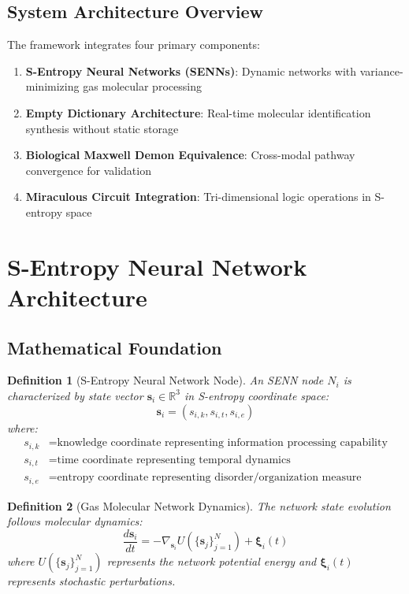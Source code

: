 \documentclass[12pt,a4paper]{article}
\newtheorem{definition}{Definition}
\begin{document}
\subsection{System Architecture Overview}

The framework integrates four primary components:

\begin{enumerate}
\item \textbf{S-Entropy Neural Networks (SENNs)}: Dynamic networks with variance-minimizing gas molecular processing
\item \textbf{Empty Dictionary Architecture}: Real-time molecular identification synthesis without static storage
\item \textbf{Biological Maxwell Demon Equivalence}: Cross-modal pathway convergence for validation
\item \textbf{Miraculous Circuit Integration}: Tri-dimensional logic operations in S-entropy space
\end{enumerate}

\section{S-Entropy Neural Network Architecture}

\subsection{Mathematical Foundation}

\begin{definition}[S-Entropy Neural Network Node]
An SENN node $N_i$ is characterized by state vector $\mathbf{s}_i \in \mathbb{R}^3$ in S-entropy coordinate space:
$$\mathbf{s}_i = (s_{i,k}, s_{i,t}, s_{i,e})$$
where:
\begin{align}
s_{i,k} &= \text{knowledge coordinate representing information processing capability} \\
s_{i,t} &= \text{time coordinate representing temporal dynamics} \\
s_{i,e} &= \text{entropy coordinate representing disorder/organization measure}
\end{align}
\end{definition}

\begin{definition}[Gas Molecular Network Dynamics]
The network state evolution follows molecular dynamics:
$$\frac{d\mathbf{s}_i}{dt} = -\nabla_{\mathbf{s}_i} U(\{\mathbf{s}_j\}_{j=1}^N) + \boldsymbol{\xi}_i(t)$$
where $U(\{\mathbf{s}_j\}_{j=1}^N)$ represents the network potential energy and $\boldsymbol{\xi}_i(t)$ represents stochastic perturbations.
\end{definition}
\end{document}
